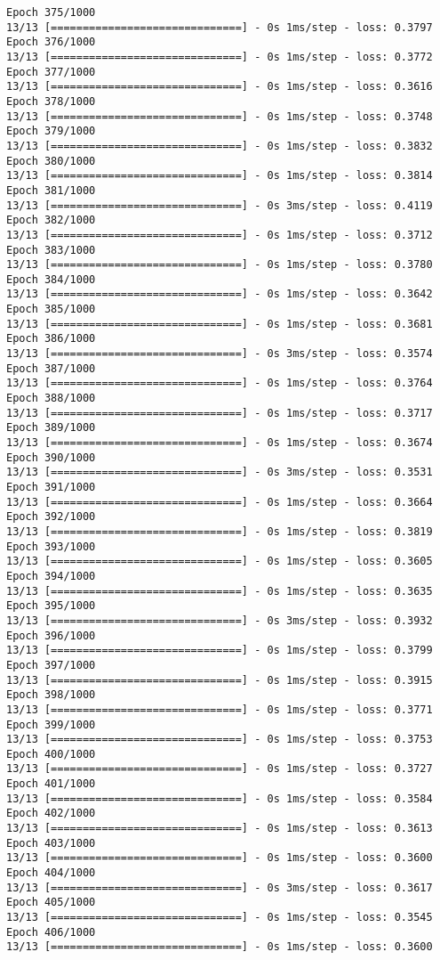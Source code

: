 \documentclass[11pt]{article}
\begin{document}
\begin{Verbatim}[commandchars=\\\{\}]
Epoch 375/1000
13/13 [==============================] - 0s 1ms/step - loss: 0.3797
Epoch 376/1000
13/13 [==============================] - 0s 1ms/step - loss: 0.3772
Epoch 377/1000
13/13 [==============================] - 0s 1ms/step - loss: 0.3616
Epoch 378/1000
13/13 [==============================] - 0s 1ms/step - loss: 0.3748
Epoch 379/1000
13/13 [==============================] - 0s 1ms/step - loss: 0.3832
Epoch 380/1000
13/13 [==============================] - 0s 1ms/step - loss: 0.3814
Epoch 381/1000
13/13 [==============================] - 0s 3ms/step - loss: 0.4119
Epoch 382/1000
13/13 [==============================] - 0s 1ms/step - loss: 0.3712
Epoch 383/1000
13/13 [==============================] - 0s 1ms/step - loss: 0.3780
Epoch 384/1000
13/13 [==============================] - 0s 1ms/step - loss: 0.3642
Epoch 385/1000
13/13 [==============================] - 0s 1ms/step - loss: 0.3681
Epoch 386/1000
13/13 [==============================] - 0s 3ms/step - loss: 0.3574
Epoch 387/1000
13/13 [==============================] - 0s 1ms/step - loss: 0.3764
Epoch 388/1000
13/13 [==============================] - 0s 1ms/step - loss: 0.3717
Epoch 389/1000
13/13 [==============================] - 0s 1ms/step - loss: 0.3674
Epoch 390/1000
13/13 [==============================] - 0s 3ms/step - loss: 0.3531
Epoch 391/1000
13/13 [==============================] - 0s 1ms/step - loss: 0.3664
Epoch 392/1000
13/13 [==============================] - 0s 1ms/step - loss: 0.3819
Epoch 393/1000
13/13 [==============================] - 0s 1ms/step - loss: 0.3605
Epoch 394/1000
13/13 [==============================] - 0s 1ms/step - loss: 0.3635
Epoch 395/1000
13/13 [==============================] - 0s 3ms/step - loss: 0.3932
Epoch 396/1000
13/13 [==============================] - 0s 1ms/step - loss: 0.3799
Epoch 397/1000
13/13 [==============================] - 0s 1ms/step - loss: 0.3915
Epoch 398/1000
13/13 [==============================] - 0s 1ms/step - loss: 0.3771
Epoch 399/1000
13/13 [==============================] - 0s 1ms/step - loss: 0.3753
Epoch 400/1000
13/13 [==============================] - 0s 1ms/step - loss: 0.3727
Epoch 401/1000
13/13 [==============================] - 0s 1ms/step - loss: 0.3584
Epoch 402/1000
13/13 [==============================] - 0s 1ms/step - loss: 0.3613
Epoch 403/1000
13/13 [==============================] - 0s 1ms/step - loss: 0.3600
Epoch 404/1000
13/13 [==============================] - 0s 3ms/step - loss: 0.3617
Epoch 405/1000
13/13 [==============================] - 0s 1ms/step - loss: 0.3545
Epoch 406/1000
13/13 [==============================] - 0s 1ms/step - loss: 0.3600

\end{Verbatim}
\end{document}
